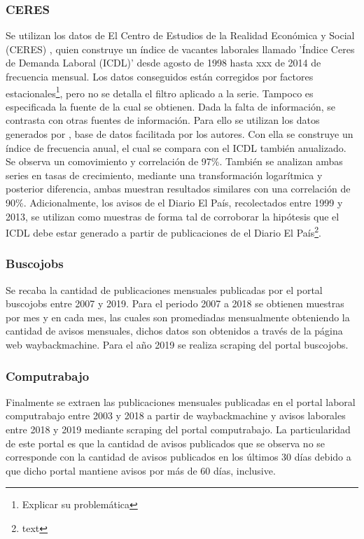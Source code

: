 \subsubsection*{CERES}
Se utilizan los datos de El Centro de Estudios de la Realidad Económica y Social (CERES) \cite{Ceres2012}, quien construye un índice de vacantes laborales llamado 'Índice Ceres de Demanda Laboral (ICDL)' desde agosto de 1998 hasta  xxx de 2014 de frecuencia mensual. Los datos conseguidos están corregidos por factores estacionales\footnote{Explicar su problemática}, pero no se detalla el filtro aplicado a la serie. Tampoco es especificada la fuente de la cual se obtienen.
Dada la falta de información, se contrasta con otras fuentes de información. Para ello se utilizan los datos generados por \cite{Alma2011}, base de datos facilitada por los autores. Con ella se construye un índice de frecuencia anual, el cual se compara con el ICDL también anualizado. Se observa un comovimiento y correlación de 97\%. También se analizan ambas series en tasas de crecimiento, mediante una transformación logarítmica y posterior diferencia, ambas muestran resultados similares con una correlación de 90\%.
Adicionalmente, los avisos de el Diario El País, recolectados entre 1999 y 2013, se utilizan como muestras de forma tal de corroborar la hipótesis que el ICDL debe estar generado a partir de publicaciones de el Diario El País\footnote{text}.

\subsubsection*{Buscojobs}
Se recaba la cantidad de publicaciones mensuales publicadas por el portal buscojobs entre 2007 y 2019. Para el periodo 2007 a 2018 se obtienen muestras por mes y en cada mes, las cuales son promediadas mensualmente obteniendo la cantidad de avisos mensuales, dichos datos son obtenidos a través de la página web waybackmachine. 
Para el año 2019 se realiza scraping del portal buscojobs.

\subsubsection*{Computrabajo}
Finalmente se extraen las publicaciones mensuales publicadas en el portal laboral computrabajo entre 2003 y 2018 a partir de waybackmachine y avisos laborales entre 2018 y 2019 mediante scraping del portal computrabajo. La particularidad de este portal es que la cantidad de avisos publicados que se observa no se corresponde con la cantidad de avisos publicados en los últimos 30 días debido a que dicho portal mantiene avisos por más de 60 días, inclusive. 



